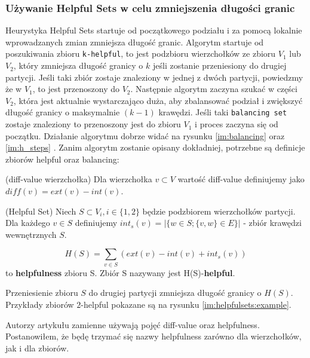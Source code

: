 \subsubsection{Używanie Helpful Sets w celu zmniejszenia długości granic}
Heurystyka Helpful Sets startuje od początkowego podziału i za pomocą lokalnie wprowadzanych zmian zmniejsza długość granic.
Algorytm startuje od poszukiwania zbioru \texttt{k-helpful}, to jest podzbioru wierzchołków ze zbioru $V_1$ lub $V_2$,
który zmniejsza długość granicy o $k$ jeśli zostanie przeniesiony do drugiej partycji.
Jeśli taki zbiór zostaje znaleziony w jednej z dwóch
partycji, powiedzmy że w $V_1$, to jest przenoszony do $V_2$. Następnie algorytm zaczyna szukać w części $V_2$, która
jest aktualnie wystarczająco duża, aby zbalansować podział i zwiększyć długość granicy o maksymalnie $(k-1)$ krawędzi.
Jeśli taki \texttt{balancing set} zostaje znaleziony to przenoszony jest do zbioru $V_1$ i proces zaczyna się od początku.
Działanie algorytmu dobrze widać na rysunku \ref{im:balancing} oraz \ref{im:h_steps} .
Zanim algorytm zostanie opisany dokładniej, potrzebne są definicje zbiorów helpful oraz balancing:

\begin{definition}
(diff-value wierzchołka)\newline
Dla wierzchołka $v \subset V$ wartość diff-value definiujemy jako $diff(v) = ext(v) - int(v)$.
\end{definition}

\begin{definition}
(Helpful Set)\newline
Niech $S \subset V_i, i \in \{1,2\}$ będzie podzbiorem wierzchołków partycji. Dla każdego $v \in S$ definiujemy
$int_s(v) = |\{w \in S; \{v,w\} \in E\}|$ - zbiór krawędzi wewnętrznych $S$.

\begin{equation}
H(S)=\sum_{v \in S}(ext(v) - int(v) + int_s(v))
\label{eq:helpful_set2}
\end{equation}
to \textbf{helpfulness} zbioru S. Zbiór S nazywany jest H(S)-\textbf{helpful}.
\end{definition}

Przeniesienie zbioru $S$ do drugiej partycji zmniejsza długość granicy o $H(S)$.
Przykłady zbiorów $2$-helpful pokazane są na rysunku \ref{im:helpfulsets:example}.

Autorzy artykułu \cite{article} zamienne używają pojęć diff-value oraz helpfulness.
Postanowiłem, że będę trzymać się nazwy helpfulness zarówno dla wierzchołków, jak i dla zbiorów.

